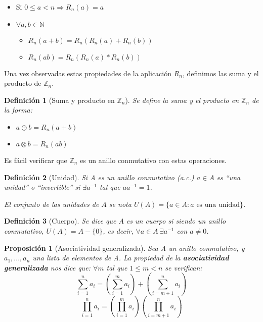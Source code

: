 \documentclass[11pt, a4paper, titlepage]{article}
\providecommand{\ent}{\mathbb{Z}}
\theoremstyle{theorem-style}
\newtheorem*{nprop}{Proposición}
\theoremstyle{definition-style}
\newtheorem*{ndef}{Definición}
\theoremstyle{remark-style}
\theoremstyle{example-style}
\begin{document}
\begin{itemize}
\item Si $0 \leq a < n  \Rightarrow R_n(a) = a$
\item $\forall a,b \in \mathbb{N}$

\begin{itemize}
	\item  $R_n(a+b) = R_n(R_n(a) + R_n(b))$
	\item $R_n(ab) = R_n(R_n(a)*R_n(b))$
\end{itemize}

\end{itemize} 


Una vez observadas estas propiedades de la aplicación $R_n$, definimos las suma y el producto de $\mathbb{Z}_n$.
\begin{ndef}[Suma y producto en $\ent_n$] Se define la suma y el producto en $\ent_n$ de la forma:
	\begin{itemize}
	\item $a\oplus b = R_n(a+b)$
	\item $a\otimes b = R_n(ab)$
\end{itemize}

\end{ndef}



Es fácil verificar que $\mathbb{Z}_n$ es un anillo conmutativo con estas operaciones.\\

\begin{ndef}[Unidad]
  Si A es un anillo conmutativo (a.c.) $a \in A$ es ``una unidad'' o ``invertible'' si $\exists a^{-1}$ tal que $ aa^{-1} = 1$.

  El conjunto de las unidades de $A$ se nota $U(A) = \{ a \in A : a \text{ es una unidad} \}$.
\end{ndef}



\begin{ndef}[Cuerpo] Se dice que $A$ es un cuerpo si siendo un anillo conmutativo, $U(A) = A - \{0\}$, es decir, $\forall a \in A \ \exists a^{-1}$  con $a \neq 0$.
\end{ndef}


\begin{nprop}[Asociatividad generalizada]
	Sea A un anillo conmutativo, y $a_1, ..., a_n$ una lista de elementos de A.
La propiedad de la \textbf{asociatividad generalizada} nos dice que:
$\forall m$ tal que $1 \leq m < n$ se verifican: \[\sum_{i=1}^{n}a_i = \left(\sum_{i=1}^{m}a_i\right) + \left(\sum_{i=m+1}^{n}a_i\right)\]\[\prod_{i=1}^{n}a_i = \left(\prod_{i=1}^{m}a_i\right)\left(\prod_{i=m+1}^{n}a_i\right)\]\\
\end{nprop}
\end{document}

